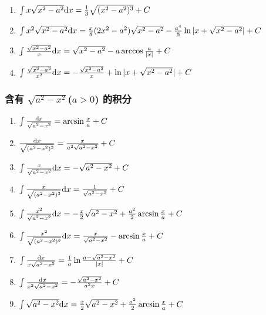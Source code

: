 \begin{small}
\begin{enumerate}
\item $ \int x \sqrt{x^2-a^2} \mathrm{d} x = \frac{1}{3} \sqrt{(x^2-a^2)^3} + C $

\item $ \int x^2\sqrt{x^2-a^2} \mathrm{d} x = \frac{x}{8}(2x^2-a^2)\sqrt{x^2-a^2} - \frac{a^4}{8}\ln|x+\sqrt{x^2-a^2}| + C $

\item $ \int \frac{\sqrt{x^2-a^2}}{x} \mathrm{d} x = \sqrt{x^2-a^2} - a \arccos\frac{a}{|x|} + C $

\item $ \int \frac{\sqrt{x^2-a^2}}{x^2} \mathrm{d} x = -\frac{\sqrt{x^2-a^2}}{x} + \ln|x + \sqrt{x^2-a^2}| + C $

\end{enumerate}

\subsubsection{含有 $\sqrt{a^2-x^2}$($a>0$) 的积分}

\begin{enumerate}

\item $ \int \frac{\mathrm{d} x}{\sqrt{a^2-x^2}} = \arcsin \frac{x}{a} + C $

\item $ \frac{\mathrm{d} x}{\sqrt{(a^2-x^2)^3}} = \frac{x}{a^2\sqrt{a^2-x^2}} + C $

\item $ \int \frac{x}{\sqrt{a^2-x^2}} \mathrm{d} x = -\sqrt{a^2-x^2} + C $

\item $ \int \frac{x}{\sqrt{(a^2-x^2)^3}} \mathrm{d} x = \frac{1}{\sqrt{a^2-x^2}} + C $

\item $ \int \frac{x^2}{\sqrt{a^2-x^2}} \mathrm{d} x = -\frac{x}{2}\sqrt{a^2-x^2} + \frac{a^2}{2}\arcsin\frac{x}{a} + C $

\item $ \int \frac{x^2}{\sqrt{(a^2-x^2)^3}} \mathrm{d} x = \frac{x}{\sqrt{a^2-x^2}} - \arcsin\frac{x}{a} + C $

\item $ \int \frac{\mathrm{d} x}{x\sqrt{a^2-x^2}} = \frac{1}{a}\ln\frac{a-\sqrt{a^2-x^2}}{|x|} + C$

\item $ \int \frac{\mathrm{d} x}{x^2\sqrt{a^2-x^2}} = -\frac{\sqrt{a^2-x^2}}{a^2x} + C $

\item $ \int \sqrt{a^2-x^2}\mathrm{d} x = \frac{x}{2}\sqrt{a^2-x^2} + \frac{a^2}{2}\arcsin\frac{x}{a} + C $


\end{enumerate}
\end{small}

